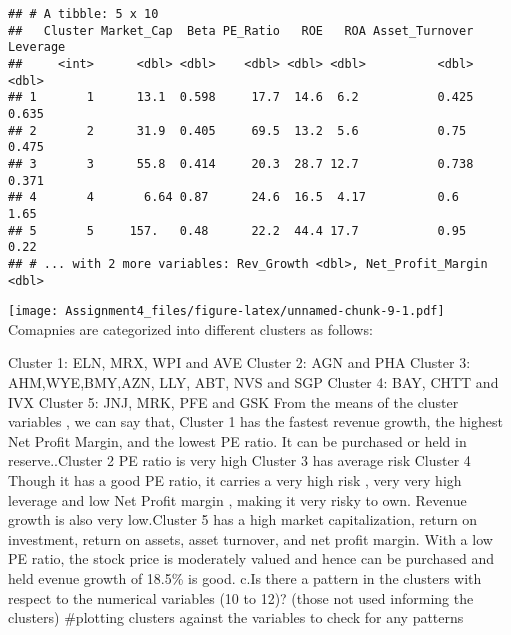 \documentclass[
]{article}
\newenvironment{Shaded}{\begin{snugshade}}{\end{snugshade}}
\newcommand{\AttributeTok}[1]{\textcolor[rgb]{0.77,0.63,0.00}{#1}}
\newcommand{\ConstantTok}[1]{\textcolor[rgb]{0.00,0.00,0.00}{#1}}
\newcommand{\DecValTok}[1]{\textcolor[rgb]{0.00,0.00,0.81}{#1}}
\newcommand{\FunctionTok}[1]{\textcolor[rgb]{0.00,0.00,0.00}{#1}}
\newcommand{\NormalTok}[1]{#1}
\newcommand{\SpecialCharTok}[1]{\textcolor[rgb]{0.00,0.00,0.00}{#1}}
\newcommand{\StringTok}[1]{\textcolor[rgb]{0.31,0.60,0.02}{#1}}
\begin{document}
\begin{verbatim}
## # A tibble: 5 x 10
##   Cluster Market_Cap  Beta PE_Ratio   ROE   ROA Asset_Turnover Leverage
##     <int>      <dbl> <dbl>    <dbl> <dbl> <dbl>          <dbl>    <dbl>
## 1       1      13.1  0.598     17.7  14.6  6.2           0.425    0.635
## 2       2      31.9  0.405     69.5  13.2  5.6           0.75     0.475
## 3       3      55.8  0.414     20.3  28.7 12.7           0.738    0.371
## 4       4       6.64 0.87      24.6  16.5  4.17          0.6      1.65 
## 5       5     157.   0.48      22.2  44.4 17.7           0.95     0.22 
## # ... with 2 more variables: Rev_Growth <dbl>, Net_Profit_Margin <dbl>
\end{verbatim}

\begin{Shaded}
\end{Shaded}

\texttt{[image: Assignment4\_files/figure-latex/unnamed-chunk-9-1.pdf]}
Comapnies are categorized into different clusters as follows:

Cluster 1: ELN, MRX, WPI and AVE Cluster 2: AGN and PHA Cluster 3:
AHM,WYE,BMY,AZN, LLY, ABT, NVS and SGP Cluster 4: BAY, CHTT and IVX
Cluster 5: JNJ, MRK, PFE and GSK From the means of the cluster variables
, we can say that, Cluster 1 has the fastest revenue growth, the highest
Net Profit Margin, and the lowest PE ratio. It can be purchased or held
in reserve..Cluster 2 PE ratio is very high Cluster 3 has average risk
Cluster 4 Though it has a good PE ratio, it carries a very high risk ,
very very high leverage and low Net Profit margin , making it very risky
to own. Revenue growth is also very low.Cluster 5 has a high market
capitalization, return on investment, return on assets, asset turnover,
and net profit margin. With a low PE ratio, the stock price is
moderately valued and hence can be purchased and held evenue growth of
18.5\% is good. c.Is there a pattern in the clusters with respect to the
numerical variables (10 to 12)? (those not used informing the clusters)
\#plotting clusters against the variables to check for any patterns
\end{document}
